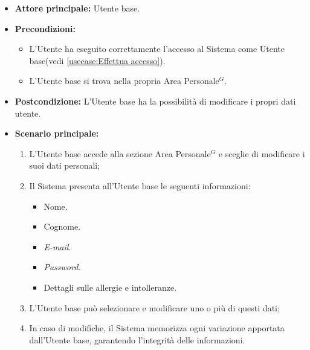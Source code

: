 \label{usecase:Modifica dati utente}
\begin{itemize}
	\item \textbf{Attore principale:} Utente base.

	\item \textbf{Precondizioni:}
	\begin{itemize}
        \item L'Utente ha eseguito correttamente l'accesso al Sistema come Utente base(vedi \autoref{usecase:Effettua accesso}).
        \item L'Utente base si trova nella propria Area Personale$^G$.
    \end{itemize}

	\item \textbf{Postcondizione:} L'Utente base ha la possibilità di modificare i propri dati utente.

	\item \textbf{Scenario principale:}
	      \begin{enumerate}
		      \item L'Utente base accede alla sezione Area Personale$^G$ e sceglie di modificare i suoi dati personali;
		      \item Il Sistema presenta all'Utente base le seguenti informazioni:
              \begin{itemize}
                \item Nome.
                \item Cognome.
                \item \textit{E-mail}.
                \item \textit{Password}.
                \item Dettagli sulle allergie e intolleranze.
              \end{itemize}
              \item L'Utente base può selezionare e modificare uno o più di questi dati;
              \item In caso di modifiche, il Sistema memorizza ogni variazione apportata dall'Utente base, garantendo l'integrità delle informazioni.
	      \end{enumerate}
\end{itemize}
